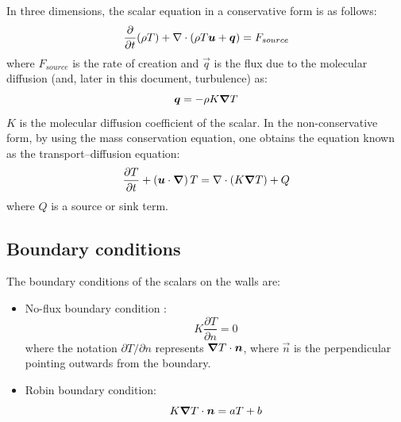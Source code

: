 In three dimensions, the scalar equation in a conservative form is as follows:%
\begin{equation}
  \dfrac{\partial}{\partial t}(\rho T)+\Div(\rho T\vec{u}+\vec{q})=F_{source}%
\end{equation}
where $F_{source}$ is the rate of creation and $\vec{q}$ is the flux due to
the molecular diffusion (and, later in this document, turbulence) as:%
\begin{equation}
  \bm{q}=-\rho K \bm{\nabla} T
\end{equation}
$K$ is the molecular diffusion coefficient of the scalar.
In the non-conservative form, by using the mass conservation equation, one
obtains the equation known as the transport--diffusion equation:%
\begin{equation}\label{eq:transport_scalaire}
  \dfrac{\partial T}{\partial t}+\left(\bm{u}\cdot\bm{\nabla}\right) T =
  \nabla \cdot\left(K\bm{\nabla} T\right)+Q
\end{equation}
where $Q$ is a source or sink term.


\subsection{\label{traceurs 3D limites}Boundary conditions}

The boundary conditions of the scalars on the walls are:
\begin{itemize}
\item No-flux boundary condition :
\begin{equation}
  K\dfrac{\partial T}{\partial n}=0
\end{equation}
where the notation $\partial T/\partial n$ represents
$\bm{\nabla} T\cdot\bm{n}$, where $\vec{n}$
is the perpendicular pointing outwards from the boundary.

\item Robin boundary condition:
\begin{equation}
  K\bm{\nabla} T\cdot\bm{n}=aT+b
\end{equation}
\end{itemize}


